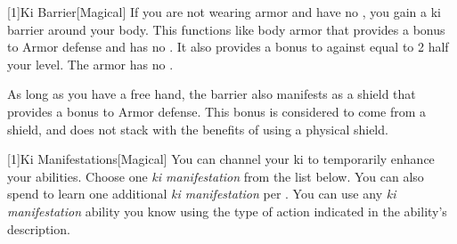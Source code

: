         [1]{Ki Barrier}[Magical]
        If you are not wearing armor and have no , you gain a ki barrier around your body.
        This functions like body armor that provides a  bonus to Armor defense and has no .
        It also provides a bonus to  against  equal to 2 \add half your level.
        The armor has no .

        As long as you have a free hand, the barrier also manifests as a shield that provides a  bonus to Armor defense.
        This bonus is considered to come from a shield, and does not stack with the benefits of using a physical shield.

        [1]{Ki Manifestations}[Magical]
        You can channel your ki to temporarily enhance your abilities.
        Choose one \textit{ki manifestation} from the list below.
        You can also spend  to learn one additional \textit{ki manifestation} per .
        You can use any \textit{ki manifestation} ability you know using the type of action indicated in the ability's description.

